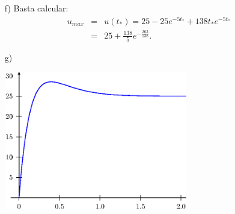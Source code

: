 \begin{resol}
\begin{itemize}
\item[f)] Basta calcular:
\begin{eqnarray*}
 u_{max}&=&u(t_\ast)= 25-25e^{-5t_\ast}+ 138 t_\ast e^{-5t_\ast}\\
&=&25+ \frac{138}{5} e^{-\frac{263}{138}}.
\end{eqnarray*}
\item[g)] 

\begin{center}\includegraphics[width=8cm]{cap_sistemas/pics/figura_7}\end{center}
\end{itemize}

\end{resol}


